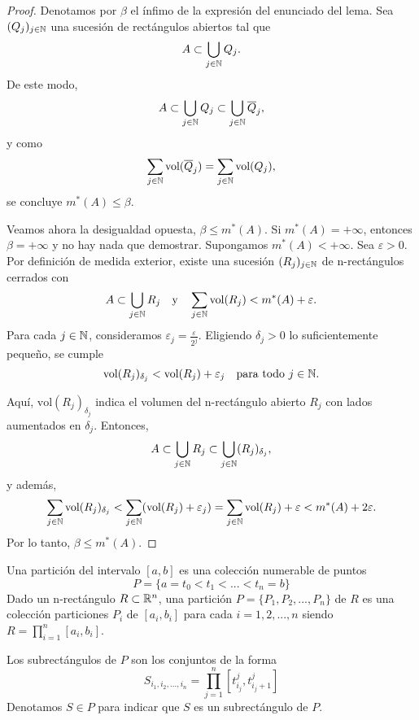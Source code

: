\begin{proof}
    Denotamos por $\beta$ el ínfimo de la expresión del enunciado del lema. Sea $(Q_j)_{j \in \mathbb{N}}$ una sucesión de rectángulos abiertos tal que
    \[
        A \subset \bigcup_{j \in \mathbb{N}} Q_j.
    \]
    De este modo,
    \[
        A \subset \bigcup_{j \in \mathbb{N}} Q_j \subset \bigcup_{j \in \mathbb{N}} \overline{Q}_j,
    \]
    y como
    \[
        \sum_{j \in \mathbb{N}} \text{vol}(\overline{Q}_j) = \sum_{j \in \mathbb{N}} \text{vol}(Q_j),
    \]
    se concluye $m^*(A) \leq \beta$.

    Veamos ahora la desigualdad opuesta, $\beta \leq m^*(A)$. Si $m^*(A) =
        +\infty$, entonces $\beta = +\infty$ y no hay nada que demostrar. Supongamos
    $m^*(A) < +\infty$. Sea $\varepsilon > 0$. Por definición de medida exterior,
    existe una sucesión $(R_j)_{j \in \mathbb{N}}$ de n-rectángulos cerrados con
    \[
        A \subset \bigcup_{j \in \mathbb{N}} R_j \quad \text{y} \quad \sum_{j \in \mathbb{N}} \text{vol}(R_j) < m^*(A) + \varepsilon.
    \]
    Para cada $j \in \mathbb{N}$, consideramos $\varepsilon_j = \frac{\varepsilon}{2^j}$.
    Eligiendo $\delta_j > 0$ lo suficientemente pequeño, se cumple
    \[
        \text{vol}(R_j)_{\delta_j} < \text{vol}(R_j) + \varepsilon_j \quad \text{para todo } j \in \mathbb{N}.
    \]

    Aquí, $\text{vol}(R_j)_{\delta_j}$ indica el volumen del n-rectángulo abierto
    $R_j$ con lados aumentados en $\delta_j$. Entonces,
    \[
        A \subset \bigcup_{j \in \mathbb{N}} R_j \subset \bigcup_{j \in \mathbb{N}} (R_j)_{\delta_j},
    \]
    y además,
    \[
        \sum_{j \in \mathbb{N}} \text{vol}(R_j)_{\delta_j} < \sum_{j \in \mathbb{N}} (\text{vol}(R_j) + \varepsilon_j) = \sum_{j \in \mathbb{N}} \text{vol}(R_j) + \varepsilon < m^*(A) + 2\varepsilon.
    \]
    Por lo tanto, $\beta \leq m^*(A)$.
\end{proof}

\begin{definición}
Una partición del intervalo $[a,b]$ es una colección numerable de puntos
$$P = \{a = t_0 < t_1 < ... < t_n = b\}$$
Dado un n-rectángulo $R \subset \mathbb{R}^n$, una partición $P =  \{P_1, P_2, ..., P_n\}$ de $R$ es una colección particiones $P_i$ de $[a_i, b_i]$ para cada $i = 1, 2, ..., n$ siendo $R = \prod_{i=1}^n [a_i, b_i]$.
\end{definición}

Los subrectángulos de $P$ son los conjuntos de la forma
\[    S_{i_1, i_2, ..., i_n} = \prod_{j=1}^n [t_{i_j}^j, t_{i_j + 1}^j]
\]
Denotamos $S \in P$ para indicar que $S$ es un subrectángulo de $P$.

